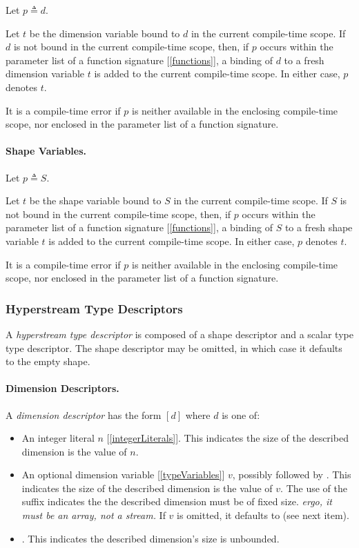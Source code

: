 \documentclass{article}
\begin{document}
 Let $p \triangleq d$.
 
 Let $t$ be the dimension variable bound to $d$ in the current compile-time scope. If $d$ is not bound in the current compile-time scope, then, if $p$ occurs within the parameter list of a function signature [\ref{functions}],  a binding of $d$ to a fresh dimension variable $t$ is added to the current compile-time scope. In either case, $p$ denotes  $t$. 

 
 It is a compile-time error if $p$ is neither available in the enclosing compile-time scope, nor enclosed in the parameter list of a function signature.
 
 \paragraph{Shape Variables.}


 Let $p \triangleq S$.
 
 Let $t$ be the shape variable bound to  $S$ in the current compile-time scope. If $S$ is not bound in the current compile-time scope, then, if $p$ occurs within the parameter list of a function signature [\ref{functions}],  a binding of  $S$ to a fresh shape variable $t$ is added to the current compile-time scope. In either case, $p$ denotes  $t$. 
 
 It is a compile-time error if $p$ is neither available in the enclosing compile-time scope, nor enclosed in the parameter list of a function signature.
 
\subsubsection{Hyperstream Type Descriptors}
\label{hyperstreamTypeDescriptors}

A {\em hyperstream type descriptor} is composed of a shape descriptor and a scalar type type descriptor. The shape descriptor may be omitted, in which case it defaults to the empty shape. 

\paragraph{Dimension Descriptors.}
A {\em dimension descriptor} has the form $[d]$ where $d$ is one of:
\begin{itemize}
\item An integer literal $n$ [\ref{integerLiterals}]. This indicates the size of the described dimension is the value of $n$.
\item An optional dimension variable [\ref{typeVariables}] $v$, possibly followed by \BANG. This indicates the size of the described dimension is the value of $v$.
The use of the \BANG{} suffix indicates the the described  dimension must be of fixed size. 
{\em ergo, it must be an array, not a stream.}
If $v$ is omitted, it defaults to \QUESTIONMARK{} (see next item). 
\item  \QUESTIONMARK. This indicates the described dimension's size is unbounded.
 \end{itemize}
 
\end{document}
